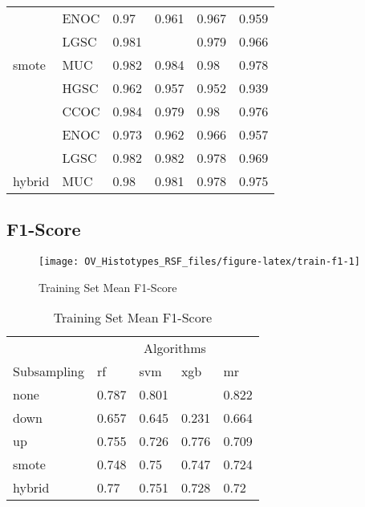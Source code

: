 \documentclass[
]{report}
\begin{document}
\begin{table}
\begin{tabular}[t]{l|l|l|l|l|l}
\cline{2-6}
 & ENOC & 0.97 & 0.961 & 0.967 & 0.959\\
\cline{2-6}
 & LGSC & 0.981 & \cellcolor[HTML]{90ee90}{0.985} & 0.979 & 0.966\\
\cline{2-6}
\multirow{-5}{*}{\raggedright\arraybackslash smote} & MUC & 0.982 & 0.984 & 0.98 & 0.978\\
\cline{1-6}
 & HGSC & 0.962 & 0.957 & 0.952 & 0.939\\
\cline{2-6}
 & CCOC & 0.984 & 0.979 & 0.98 & 0.976\\
\cline{2-6}
 & ENOC & 0.973 & 0.962 & 0.966 & 0.957\\
\cline{2-6}
 & LGSC & 0.982 & 0.982 & 0.978 & 0.969\\
\cline{2-6}
\multirow{-5}{*}{\raggedright\arraybackslash hybrid} & MUC & 0.98 & 0.981 & 0.978 & 0.975\\
\hline
\end{tabular}
\end{table}

\hypertarget{f1-score-1}{%
\subsection{F1-Score}\label{f1-score-1}}

\begin{figure}[H]

{\centering \texttt{[image: OV\_Histotypes\_RSF\_files/figure-latex/train-f1-1]} 

}

\caption{Training Set Mean F1-Score}\label{fig:train-f1}
\end{figure}

\begin{table}

\caption{\label{tab:train-f1-table}Training Set Mean F1-Score}
\centering
\begin{tabular}[t]{l|l|l|l|l}
\hline
\multicolumn{1}{c|}{ } & \multicolumn{4}{c}{Algorithms} \\
\cline{2-5}
Subsampling & rf & svm & xgb & mr\\
\hline
none & 0.787 & 0.801 & \cellcolor[HTML]{90ee90}{0.897} & 0.822\\
\hline
down & 0.657 & 0.645 & 0.231 & 0.664\\
\hline
up & 0.755 & 0.726 & 0.776 & 0.709\\
\hline
smote & 0.748 & 0.75 & 0.747 & 0.724\\
\hline
hybrid & 0.77 & 0.751 & 0.728 & 0.72\\
\hline
\end{tabular}
\end{table}
\end{document}
